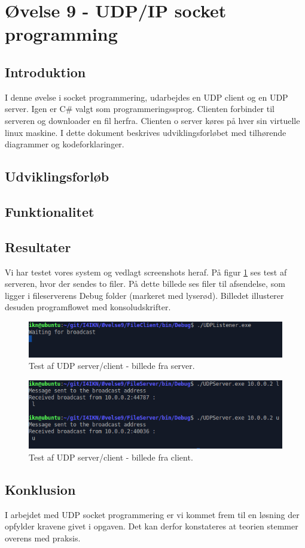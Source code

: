 \section{Øvelse 9 - UDP/IP socket programming}

\subsection{Introduktion}
I denne øvelse i socket programmering, udarbejdes en UDP client og en UDP server. Igen er C\# valgt som programmeringssprog. Clienten forbinder til serveren og downloader en fil herfra. Clienten o server køres på hver sin virtuelle linux maskine. I dette dokument beskrives udviklingsforløbet med tilhørende diagrammer og kodeforklaringer.

\subsection{Udviklingsforløb}

\subsection{Funktionalitet}

\subsection{Resultater}
Vi har testet vores system og vedlagt screenshots heraf. På figur \ref{fig:udp_h1} ses test af serveren, hvor der sendes to filer. På dette billede ses filer til afsendelse, som ligger i fileserverens Debug folder (markeret med lyserød). Billedet illusterer desuden programflowet med konsoludskrifter.

\begin{figure}[H]
	\centering
	\includegraphics[width=0.9\linewidth]{figs/udp_h1}
	\caption{Test af UDP server/client - billede fra server.}
	\label{fig:udp_h1}
\end{figure}

\begin{figure}[H]
	\centering
	\includegraphics[width=0.9\linewidth]{figs/udp_h2}
	\caption{Test af UDP server/client - billede fra client.}
	\label{fig:udp_h2}
\end{figure}

\subsection{Konklusion}
I arbejdet med UDP socket programmering er vi kommet frem til en løsning der opfylder kravene givet i opgaven. Det kan derfor konstateres at teorien stemmer overens med praksis.